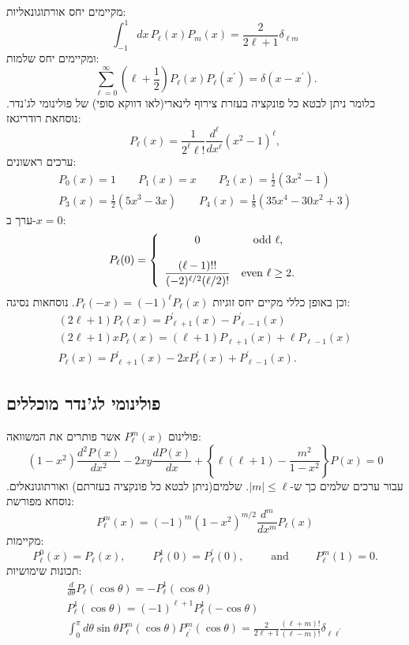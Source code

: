 \documentclass{tstextbook}
\begin{document}
מקיימים יחס אורתוגונאליות:
$$\int_{-1}^{1}d x\,P_{\ell}(x)P_{m}(x)=\frac{2}{2\ell+1}\delta_{\ell m}$$
ומקיימים יחס שלמות:
$$\sum_{\ell=0}^{\infty}\left(\ell+\textstyle{\frac{1}{2}}\right)P_{\ell}(x)P_{\ell}(x^{\prime})=\delta(x-x^{\prime}).$$
כלומר ניתן לבטא כל פונקציה בעזרת צירוף לינארי(לאו דווקא סופי) של פולינומי לג'נדר.
נוסחאת רודריגאז:
$$P_{\ell}(x)={\frac{1}{2^{\ell}\ell!}}{\frac{d^{\ell}}{d x^{\ell}}}(x^{2}-1)^{\ell},$$
ערכים ראשונים:
$$\begin{gather}{{P_{0}(x)=1}}\qquad  {{P_{1}(x)=x}}\qquad  {{P_{2}(x)=\displaystyle\frac{1}{2}(3x^{2}-1)}}\\ {{P_{3}(x)=\frac{1}{2}(5x^{3}-3x)}}\qquad  {{P_{4}(x)=\displaystyle\frac{1}{8}(35x^{4}-30x^{2}+3)}}\end{gather}$$
ערך ב-\(x=0\):
$$P_{\ell}(0)=\left\{\begin{array}{c c}{{0}}&{{\mathrm{odd\,\,}\ell,}}\\ {{}}&{{}}\\ {{\displaystyle\frac{(\ell-1)!!}{(-2)^{\ell/2}(\ell/2)!}}}&{{\mathrm{even\,\,}\ell\ge2.}}\end{array}\right.$$
וכן באופן כללי מקיים יחס זוגיות \(P_{\ell}(-x)=(-1)^{\ell}P_{\ell}(x)\). נוסחאות נסיגה:
$$\begin{array}{c}{{(2\ell+1)P_{\ell}(x)=P_{\ell+1}^{\prime}(x)-P_{\ell-1}^{\prime}(x)}}\\ {{(2\ell+1)x P_{\ell}(x)=(\ell+1)P_{\ell+1}(x)+\ell P_{\ell-1}(x)}}\\ {{P_{\ell}(x)=P_{\ell+1}^{\prime}(x)-2x P_{\ell}^{\prime}(x)+P_{\ell-1}^{\prime}(x).}}\end{array}$$

\subsection{פולינומי לג'נדר מוכללים}

פולינום \(P_{\ell}^{m}(x)\) אשר פותרים את המשוואה:
$$(1-x^{2})\frac{d^{2}P(x)}{d x^{2}}-2x y\frac{d P(x)}{d x}+\left\{\ell(\ell+1)-\frac{m^{2}}{1-x^{2}}\right\}P(x)=0$$
עבור ערכים שלמים כך ש-\(\lvert m \rvert\leq \ell\). שלמים(ניתן לבטא כל פונקציה בעזרתם) ואורתוגונאלים. נוסחא מפורשת:
$$P_{\ell}^{m}(x)=(-1)^{m}(1-x^{2})^{m/2}{\frac{d^{m}}{d x^{m}}}P_{\ell}(x)$$
מקיימות:
$$P_{\ell}^{0}(x)=P_{\ell}(x),\phantom{s p a c e}P_{\ell}^{1}(0)=P_{\ell}^{\prime}(0),\phantom{s p a c e}\mathrm{and}\phantom{s p a c e}P_{\ell}^{m}(1)=0.$$
תכונות שימושיות:
$$\begin{gather}\frac{d}{d\theta}P_{\ell}(\cos\theta)=-P_{\ell}^{1}(\cos\theta) \\P_{\ell}^{1}(\cos\theta)=(-1)^{\ell+1}P_{\ell}^{1}(-\cos\theta) \\\int_{0}^{\pi}d\theta\sin\theta P_{\ell}^{m}(\cos\theta)P_{\ell^{\prime}}^{m}(\cos\theta)=\frac{2}{2\ell+1}\frac{(\ell+m)!}{(\ell-m)!}\delta_{\ell\ell^{\prime}}
\end{gather}$$
\end{document}
